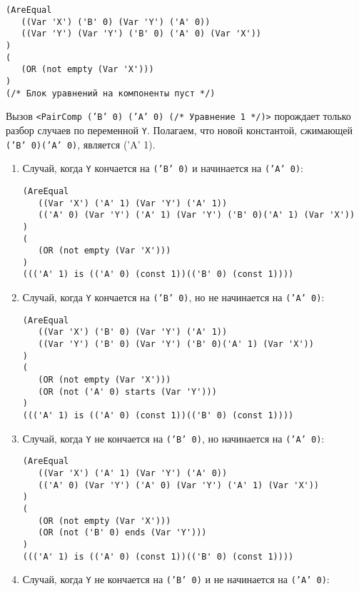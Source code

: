 \documentclass[12pt]{article}
\begin{document}
\begin{verbatim}
(AreEqual 
   ((Var 'X') ('B' 0) (Var 'Y') ('A' 0))
   ((Var 'Y') (Var 'Y') ('B' 0) ('A' 0) (Var 'X'))
)
(
   (OR (not empty (Var 'X')))
)
(/* Блок уравнений на компоненты пуст */)
\end{verbatim}
 
Вызов \texttt{<PairComp ('B' 0) ('A' 0) (/* Уравнение 1 */)>} порождает только разбор случаев по переменной \verb|Y|. Полагаем, что новой константой, сжимающей \texttt{('B' 0)('A' 0)}, является ('A' 1). 

\begin{enumerate}
\item Случай, когда \verb|Y| кончается на \texttt{('B' 0)} и начинается на \texttt{('A' 0)}:

\begin{verbatim}
(AreEqual 
   ((Var 'X') ('A' 1) (Var 'Y') ('A' 1))
   (('A' 0) (Var 'Y') ('A' 1) (Var 'Y') ('B' 0)('A' 1) (Var 'X'))
)
(
   (OR (not empty (Var 'X')))
)
((('A' 1) is (('A' 0) (const 1))(('B' 0) (const 1))))
\end{verbatim}
 
\item Случай, когда \verb|Y| кончается на \texttt{('B' 0)}, но не начинается на \texttt{('A' 0)}:

\begin{verbatim}
(AreEqual 
   ((Var 'X') ('B' 0) (Var 'Y') ('A' 1))
   ((Var 'Y') ('B' 0) (Var 'Y') ('B' 0)('A' 1) (Var 'X'))
)
(
   (OR (not empty (Var 'X')))
   (OR (not ('A' 0) starts (Var 'Y')))
)
((('A' 1) is (('A' 0) (const 1))(('B' 0) (const 1))))
\end{verbatim}

\item Случай, когда \verb|Y| не кончается на \texttt{('B' 0)}, но начинается на \texttt{('A' 0)}:

\begin{verbatim}
(AreEqual 
   ((Var 'X') ('A' 1) (Var 'Y') ('A' 0))
   (('A' 0) (Var 'Y') ('A' 0) (Var 'Y') ('A' 1) (Var 'X'))
)
(
   (OR (not empty (Var 'X')))
   (OR (not ('B' 0) ends (Var 'Y')))
)
((('A' 1) is (('A' 0) (const 1))(('B' 0) (const 1))))
\end{verbatim}

\item Случай, когда \verb|Y| не кончается на \texttt{('B' 0)} и не начинается на \texttt{('A' 0)}:


\end{enumerate}
\end{document}
